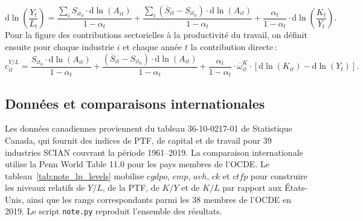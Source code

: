 \documentclass[11pt, letterpaper]{article}
\begin{document}
\begin{equation}
   \label{eq:lp_decomp_final}
   \mathrm{d}\ln\left(\frac{Y_t}{L_t}\right) = \frac{\sum\nolimits_i S_{it_0} \cdot \mathrm{d}\ln(A_{it})}{1 - \alpha_t} + \frac{\sum\nolimits_i (\overline{S}_{it} - S_{it_0}) \cdot \mathrm{d}\ln(A_{it})}{1 - \alpha_t} + \frac{\alpha_t}{1 - \alpha_t} \cdot \mathrm{d}\ln\left(\frac{K_t}{Y_t}\right).
\end{equation}
Pour la figure des contributions sectorielles à la productivité du travail, on définit ensuite pour chaque industrie $i$ et chaque année $t$ la contribution directe\,:
\begin{equation}
   \label{eq:contribution}
   c_{it}^{Y/L} = \frac{S_{it_0} \cdot \mathrm{d}\ln(A_{it})}{1 - \alpha_t} + \frac{(\overline{S}_{it} - S_{it_0}) \cdot \mathrm{d}\ln(A_{it})}{1 - \alpha_t} + \frac{\alpha_t}{1 - \alpha_t} \cdot \overline{\omega}^K_{it} \cdot [\mathrm{d}\ln(K_{it}) - \mathrm{d}\ln(Y_t)].
\end{equation}

\subsection{Données et comparaisons internationales}

Les données canadiennes proviennent du tableau 36-10-0217-01 de Statistique Canada, qui fournit des indices de PTF, de capital et de travail pour 39 industries SCIAN couvrant la période 1961--2019. La comparaison internationale utilise la Penn World Table 11.0 pour les pays membres de l'OCDE. Le tableau~\ref{tab:note_lp_levels} mobilise $cgdpo$, $emp$, $avh$, $ck$ et $ctfp$ pour construire les niveaux relatifs de $Y/L$, de la PTF, de $K/Y$ et de $K/L$ par rapport aux États-Unis, ainsi que les rangs correspondants parmi les 38 membres de l'OCDE en 2019. Le script \texttt{note.py} reproduit l'ensemble des résultats.
\end{document}

